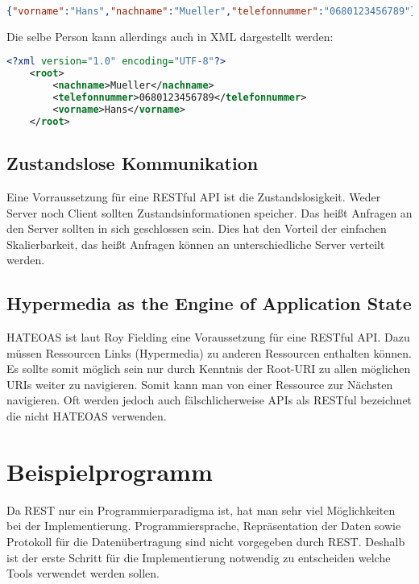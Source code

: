 \documentclass[listof=totoc]{article}
\begin{document}
	
	\begin{lstlisting}[language=json,caption=\ac{JSON}-Repräsentation (application/json)]
		{"vorname":"Hans","nachname":"Mueller","telefonnummer":"0680123456789"}
	\end{lstlisting}
	
	Die selbe Person kann allerdings auch in \ac{XML} dargestellt werden:
	\begin{lstlisting}[language=XML,caption=\ac{XML}-Repräsentation (application/xml)]
	<?xml version="1.0" encoding="UTF-8"?>
	<root>
		<nachname>Mueller</nachname>
		<telefonnummer>0680123456789</telefonnummer>
		<vorname>Hans</vorname>
	</root>
	\end{lstlisting}
	\newpage
	
	
	\subsection{Zustandslose Kommunikation}
	Eine Vorraussetzung für eine \ac{REST}ful \ac{API} ist die Zustandslosigkeit. Weder Server noch Client sollten Zustandsinformationen speicher. Das heißt Anfragen an den Server sollten in sich geschlossen sein. Dies hat den Vorteil der einfachen Skalierbarkeit, das heißt Anfragen können an unterschiedliche Server verteilt werden. \cite[p.~6]{RESTBOOK}
	
	\subsection{Hypermedia as the Engine of Application State}
	\ac{HATEOAS} ist laut Roy Fielding eine Voraussetzung für eine \ac{REST}ful \ac{API}.\cite{HATEOAS_ROY}
	Dazu müssen Ressourcen Links (Hypermedia) zu anderen Ressourcen enthalten können. Es sollte somit möglich sein nur durch Kenntnis der Root-\ac{URI} zu allen möglichen \ac{URI}s weiter zu navigieren. 
	Somit kann man von einer Ressource zur Nächsten navigieren. 
	\newline
	Oft werden jedoch auch fälschlicherweise \ac{API}s als \ac{REST}ful bezeichnet die nicht \ac{HATEOAS} verwenden.
	\newpage
	
	\section{Beispielprogramm}
	Da \ac{REST} nur ein Programmierparadigma ist, hat man sehr viel Möglichkeiten bei der Implementierung. Programmiersprache, Repräsentation der Daten sowie Protokoll für die Datenübertragung sind nicht vorgegeben durch \ac{REST}. Deshalb ist der erste Schritt für die Implementierung notwendig zu entscheiden welche Tools verwendet werden sollen.
\end{document}
